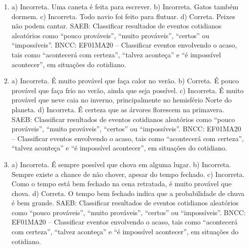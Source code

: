 \begin{enumerate}
\item
a) Incorreta. Uma caneta é feita para escrever.
b) Incorreta. Gatos também dormem.
c) Incorreta. Todo navio foi feito para flutuar.
d) Correta. Peixes não podem cantar.
SAEB: Classificar resultados de eventos cotidianos aleatórios como
``pouco prováveis'', ``muito prováveis'', ``certos'' ou ``impossíveis''.
BNCC: EF01MA20 -- Classificar eventos envolvendo o acaso, tais como
``acontecerá com certeza'', ``talvez aconteça'' e ``é impossível
acontecer'', em situações do cotidiano.

\item
a) Incorreta. É muito provável que faça calor no verão.
b) Correta. É pouco provável que faça frio no verão, ainda que seja
possível.
c) Incorreta. É muito provável que neve caia no inverno, principalmente
no hemisfério Norte do planeta.
d) Incorreta. É certeza que as árvores florescem na primavera.
SAEB: Classificar resultados de eventos cotidianos aleatórios como
``pouco prováveis'', ``muito prováveis'', ``certos'' ou ``impossíveis''.
BNCC: EF01MA20 -- Classificar eventos envolvendo o acaso, tais como
``acontecerá com certeza'', ``talvez aconteça'' e ``é impossível
acontecer'', em situações do cotidiano.

\item
a) Incorreta. É sempre possível que chova em alguma lugar.
b) Incorreta. Sempre existe a chance de não chover, apesar do tempo fechado.
c) Incorreta. Como o tempo está bem fechado na cena retratada, é muito provável que chova.
d) Correta. O tempo bem fechado indica que a probabilidade de chuva é bem grande.
SAEB: Classificar
resultados de eventos cotidianos aleatórios como ``pouco prováveis'',
``muito prováveis'', ``certos'' ou ``impossíveis''.
BNCC: EF01MA20 -- Classificar eventos envolvendo o acaso, tais como
``acontecerá com certeza'', ``talvez aconteça'' e ``é impossível
acontecer'', em situações do cotidiano.
\end{enumerate}


